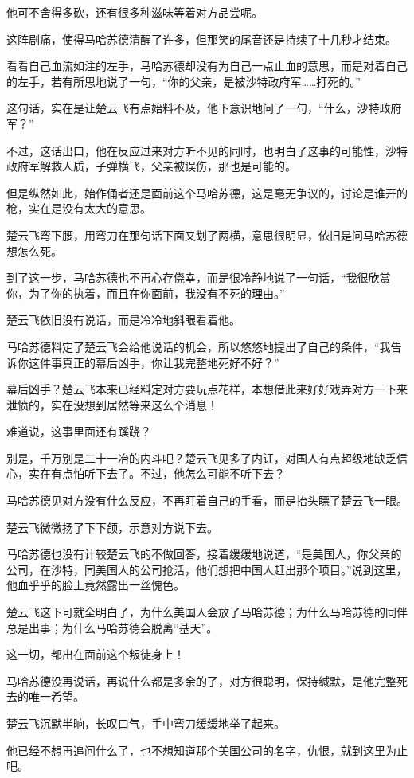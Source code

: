 他可不舍得多砍，还有很多种滋味等着对方品尝呢。

这阵剧痛，使得马哈苏德清醒了许多，但那笑的尾音还是持续了十几秒才结束。

看看自己血流如注的左手，马哈苏德却没有为自己一点止血的意思，而是对着自己的左手，若有所思地说了一句，“你的父亲，是被沙特政府军……打死的。”

这句话，实在是让楚云飞有点始料不及，他下意识地问了一句，“什么，沙特政府军？”

不过，这话出口，他在反应过来对方听不见的同时，也明白了这事的可能性，沙特政府军解救人质，子弹横飞，父亲被误伤，那也是可能的。

但是纵然如此，始作俑者还是面前这个马哈苏德，这是毫无争议的，讨论是谁开的枪，实在是没有太大的意思。

楚云飞弯下腰，用弯刀在那句话下面又划了两横，意思很明显，依旧是问马哈苏德想怎么死。

到了这一步，马哈苏德也不再心存侥幸，而是很冷静地说了一句话，“我很欣赏你，为了你的执着，而且在你面前，我没有不死的理由。”

楚云飞依旧没有说话，而是冷冷地斜眼看着他。

马哈苏德料定了楚云飞会给他说话的机会，所以悠悠地提出了自己的条件，“我告诉你这件事真正的幕后凶手，你让我完整地死好不好？”

幕后凶手？楚云飞本来已经料定对方要玩点花样，本想借此来好好戏弄对方一下来泄愤的，实在没想到居然等来这么个消息！

难道说，这事里面还有蹊跷？

别是，千万别是二十一冶的内斗吧？楚云飞见多了内讧，对国人有点超级地缺乏信心，实在有点怕听下去了。不过，他怎么可能不听下去？

马哈苏德见对方没有什么反应，不再盯着自己的手看，而是抬头瞟了楚云飞一眼。

楚云飞微微扬了下下颌，示意对方说下去。

马哈苏德也没有计较楚云飞的不做回答，接着缓缓地说道，“是美国人，你父亲的公司，在沙特，同美国人的公司抢活，他们想把中国人赶出那个项目。”说到这里，他血乎乎的脸上竟然露出一丝愧色。

楚云飞这下可就全明白了，为什么美国人会放了马哈苏德；为什么马哈苏德的同伴总是出事；为什么马哈苏德会脱离“基天”。

这一切，都出在面前这个叛徒身上！

马哈苏德没再说话，再说什么都是多余的了，对方很聪明，保持缄默，是他完整死去的唯一希望。

楚云飞沉默半晌，长叹口气，手中弯刀缓缓地举了起来。

他已经不想再追问什么了，也不想知道那个美国公司的名字，仇恨，就到这里为止吧。

